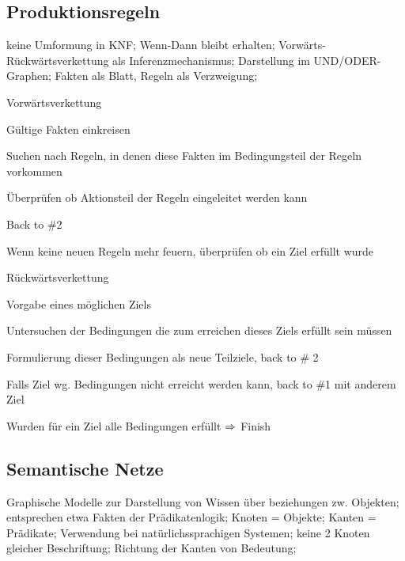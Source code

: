 \documentclass[german,color,6pt]{latex4ei/latex4ei_sheet}
\begin{document}
\begin{sectionbox}
\subsection{Produktionsregeln}
keine Umformung in KNF; Wenn-Dann bleibt erhalten; Vorwärts- Rückwärtsverkettung als Inferenzmechanismus; Darstellung im UND/ODER-Graphen; Fakten als Blatt, Regeln als Verzweigung;
\end{sectionbox}

\begin{sectionbox}
\begin{cookbox}{Vorwärtsverkettung}
	\item Gültige Fakten einkreisen
	\item Suchen nach Regeln, in denen diese Fakten im Bedingungsteil der Regeln vorkommen
	\item Überprüfen ob Aktionsteil der Regeln eingeleitet werden kann
	\item Back to \#2
	\item Wenn keine neuen Regeln mehr feuern, überprüfen ob ein Ziel erfüllt wurde
\end{cookbox}

\begin{cookbox}{Rückwärtsverkettung}
	\item Vorgabe eines möglichen Ziels
	\item Untersuchen der Bedingungen die zum erreichen dieses Ziels erfüllt sein müssen
	\item Formulierung dieser Bedingungen als neue Teilziele, back to \# 2
	\item Falls Ziel wg. Bedingungen nicht erreicht werden kann, back to \#1 mit anderem Ziel
	\item Wurden für ein Ziel alle Bedingungen erfüllt $\Rightarrow$ Finish
\end{cookbox}
\end{sectionbox}

\begin{sectionbox}
\subsection{Semantische Netze}
Graphische Modelle zur Darstellung von Wissen über beziehungen zw. Objekten; entsprechen etwa Fakten der Prädikatenlogik; Knoten = Objekte; Kanten = Prädikate; Verwendung bei natürlichssprachigen Systemen; keine 2 Knoten gleicher Beschriftung; Richtung der Kanten von Bedeutung; 
\end{sectionbox}
\end{document}
